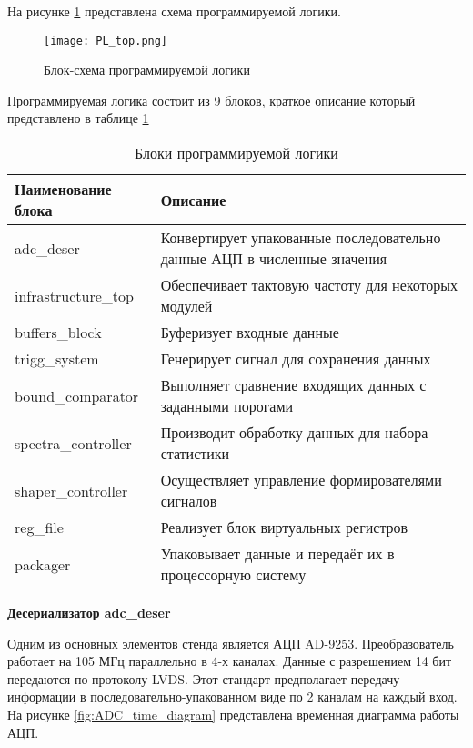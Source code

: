 На рисунке \ref{fig:PL_top} представлена схема программируемой логики.\par 
\begin{figure}[ht]
    \centering
    \texttt{[image: PL\_top.png]}
    \caption{Блок-схема программируемой логики}
    \label{fig:PL_top}
\end{figure}
Программируемая логика состоит из 9 блоков, краткое описание который представлено в таблице \ref{tab:PL_top_blocks}\par
\begin{table}[ht] \label{tab:PL_top_blocks}
    \caption{Блоки программируемой логики}
    \begin{tabular}{|p{}|p{}|}
        \hline
        Наименование блока & Описание \\
        \hline
        adc\_deser & Конвертирует упакованные последовательно данные АЦП в численные значения \\
        \hline
        infrastructure\_top & Обеспечивает тактовую частоту для некоторых модулей \\
        \hline
        buffers\_block & Буферизует входные данные \\
        \hline
        trigg\_system & Генерирует сигнал для сохранения данных \\
        \hline
        bound\_comparator & Выполняет сравнение входящих данных с заданными порогами \\
        \hline
        spectra\_controller & Производит обработку данных для набора статистики \\
        \hline
        shaper\_controller & Осуществляет управление формирователями сигналов \\
        \hline
        reg\_file & Реализует блок виртуальных регистров \\
        \hline
        packager & Упаковывает данные и передаёт их в процессорную систему \\
        \hline
    \end{tabular}
\end{table}
\textbf{Десериализатор adc\_deser}\par
Одним из основных элементов стенда является АЦП AD-9253. Преобразователь работает на 105 МГц параллельно в 4-х каналах. Данные с разрешением 14 бит передаются по протоколу LVDS. Этот стандарт предполагает передачу информации в последовательно-упакованном виде по 2 каналам на каждый вход. На рисунке \ref{fig:ADC_time_diagram} представлена временная диаграмма работы АЦП.\par
